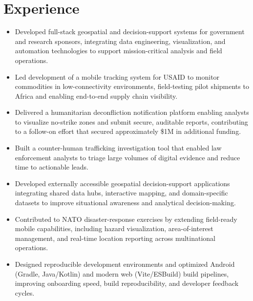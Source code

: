 
\section{Experience}


\begin{itemize}
\item Developed full-stack geospatial and decision-support systems for government and research sponsors, integrating data engineering, visualization, and automation technologies to support mission-critical analysis and field operations.
\item Led development of a mobile tracking system for USAID to monitor commodities in low-connectivity environments, field-testing pilot shipments to Africa and enabling end-to-end supply chain visibility.
\item Delivered a humanitarian deconfliction notification platform enabling analysts to visualize no-strike zones and submit secure, auditable reports, contributing to a follow-on effort that secured approximately \$1M in additional funding.
\item Built a counter-human trafficking investigation tool that enabled law enforcement analysts to triage large volumes of digital evidence and reduce time to actionable leads.
\item Developed externally accessible geospatial decision-support applications integrating shared data hubs, interactive mapping, and domain-specific datasets to improve situational awareness and analytical decision-making.
\item Contributed to NATO disaster-response exercises by extending field-ready mobile capabilities, including hazard visualization, area-of-interest management, and real-time location reporting across multinational operations.
\item Designed reproducible development environments and optimized Android (Gradle, Java/Kotlin) and modern web (Vite/ESBuild) build pipelines, improving onboarding speed, build reproducibility, and developer feedback cycles.
\end{itemize}

\vspace{0.5em}


